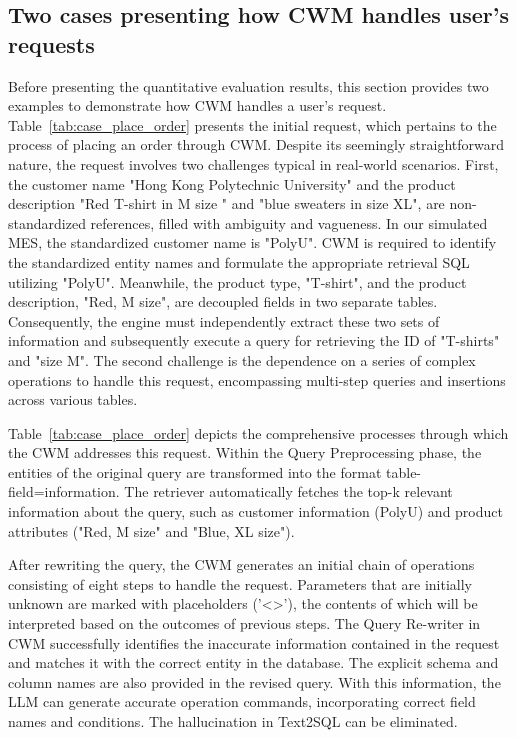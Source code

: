 \documentclass[preprint,12pt]{elsarticle}
\begin{document}
\subsection{Two cases presenting how CWM handles user's requests}
\label{sec:exp_cases}
Before presenting the quantitative evaluation results, this section provides two examples to demonstrate how CWM handles a user's request.
Table~\ref{tab:case_place_order} presents the initial request, which pertains to the process of placing an order through CWM. Despite its seemingly straightforward nature, the request involves two challenges typical in real-world scenarios.
First, the customer name "Hong Kong Polytechnic University" and the product description "Red T-shirt in M size " and "blue sweaters in size XL", are non-standardized references, filled with ambiguity and vagueness.
In our simulated MES, the standardized customer name is "PolyU".
CWM is required to identify the standardized entity names and formulate the appropriate retrieval SQL utilizing "PolyU". 
Meanwhile, the product type, "T-shirt", and the product description, "Red, M size", are decoupled fields in two separate tables.
Consequently, the engine must independently extract these two sets of information and subsequently execute a query for retrieving the ID of "T-shirts" and "size M".
The second challenge is the dependence on a series of complex operations to handle this request, encompassing multi-step queries and insertions across various tables.

Table~\ref{tab:case_place_order} depicts the comprehensive processes through which the CWM addresses this request. 
Within the Query Preprocessing phase, the entities of the original query are transformed into the format {table-field=information}. 
The retriever automatically fetches the top-k relevant information about the query, such as customer information (PolyU) and product attributes ("Red, M size" and "Blue, XL size"). 

After rewriting the query, the CWM generates an initial chain of operations consisting of eight steps to handle the request. 
Parameters that are initially unknown are marked with placeholders ('<>'), the contents of which will be interpreted based on the outcomes of previous steps.
The Query Re-writer in CWM successfully identifies the inaccurate information contained in the request and matches it with the correct entity in the database. 
The explicit schema and column names are also provided in the revised query.
With this information, the LLM can generate accurate operation commands, incorporating correct field names and conditions.
The hallucination in Text2SQL can be eliminated.
\end{document}
